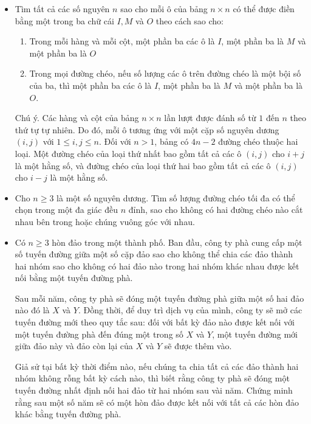 \documentclass[11pt]{scrartcl}
\begin{document}
\begin{itemize}[label=, leftmargin=0em, itemsep=-0em]
    \item \begin{btvn}
        Tìm tất cả các số nguyên $n$ sao cho mỗi ô của bảng $n \times n$ có thể được điền bằng một trong ba chữ cái $I, M$ và $O$ theo cách sao cho:
        \begin{enumerate}
            \item Trong mỗi hàng và mỗi cột, một phần ba các ô là $I$, một phần ba là $M$ và một phần ba là $O$
            \item Trong mọi đường chéo, nếu số lượng các ô trên đường chéo là một bội số của ba, thì một phần ba các ô là $I$, một phần ba là $M$ và một phần ba là $O$.
        \end{enumerate}
        Chú ý. Các hàng và cột của bảng $n \times n$ lần lượt được đánh số từ $1$ đến $n$ theo thứ tự tự nhiên. Do đó, mỗi ô tương ứng với một cặp số nguyên dương $(i,j)$ với $1 \le i,j \le n$. Đối với $n>1$, bảng có $4n-2$ đường chéo thuộc hai loại. Một đường chéo của loại thứ nhất bao gồm tất cả các ô $(i,j)$ cho $i+j$ là một hằng số, và đường chéo của loại thứ hai bao gồm tất cả các ô $(i,j)$ cho $i-j$ là một hằng số.
    \end{btvn}

    \item \begin{btvn}
        Cho $n \geq 3$ là một số nguyên dương. Tìm số lượng đường chéo tối đa có thể chọn trong một đa giác đều $n$ đỉnh, sao cho không có hai đường chéo nào cắt nhau bên trong hoặc chúng vuông góc với nhau.
    \end{btvn}

    \item \begin{btvn}
        Có $n \geq 3$ hòn đảo trong một thành phố. Ban đầu, công ty phà cung cấp một số tuyến đường giữa một số cặp đảo sao cho không thể chia các đảo thành hai nhóm sao cho không có hai đảo nào trong hai nhóm khác nhau được kết nối bằng một tuyến đường phà.

        Sau mỗi năm, công ty phà sẽ đóng một tuyến đường phà giữa một số hai đảo nào đó là $X$ và $Y$. Đồng thời, để duy trì dịch vụ của mình, công ty sẽ mở các tuyến đường mới theo quy tắc sau: đối với bất kỳ đảo nào được kết nối với một tuyến đường phà đến đúng một trong số $X$ và $Y$, một tuyến đường mới giữa đảo này và đảo còn lại của $X$ và $Y$ sẽ được thêm vào.

        Giả sử tại bất kỳ thời điểm nào, nếu chúng ta chia tất cả các đảo thành hai nhóm không rỗng bất kỳ cách nào, thì biết rằng công ty phà sẽ đóng một tuyến đường nhất định nối hai đảo từ hai nhóm sau vài năm. Chứng minh rằng sau một số năm sẽ có một hòn đảo được kết nối với tất cả các hòn đảo khác bằng tuyến đường phà.       
    \end{btvn}


\end{itemize}
\end{document}
